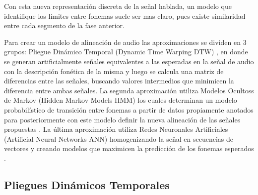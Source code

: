 Con esta nueva representación discreta de la señal hablada, un modelo que identifique los límites entre fonemas suele ser mas claro, pues existe similaridad entre cada segmento de la fase anterior.

Para crear un modelo de alineación de audio las aproximaciones se dividen en 3 grupos: Pliegue Dinámico Temporal (Dynamic Time Warping DTW)  \cite{Sakoe1978DynamicRecognition}, en donde se generan artificialmente señales equivalentes a las esperadas en la señal de audio con la descripción fonética de la misma y luego se calcula una matriz de diferencias entre las señales, buscando valores intermedios que minimicen la diferencia entre ambas señales. La segunda aproximación utiliza Modelos Ocultoss de Markov (Hidden Markov Models HMM) los cuales determinan un modelo probabilístico de transición entre fonemas a partir de datos propiamente anotados para posteriormente con este modelo definir la nueva alineación de las señales propuestas \cite{RabinerARecognition}. La última aproximación utiliza Redes Neuronales Artificiales (Artificial Neural Networks ANN) homogenizando la señal en secuencias de vectores y creando modelos que maximicen la predicción de los fonemas esperados  \cite{Deng2012}.

\subsection{Pliegues Dinámicos Temporales}

